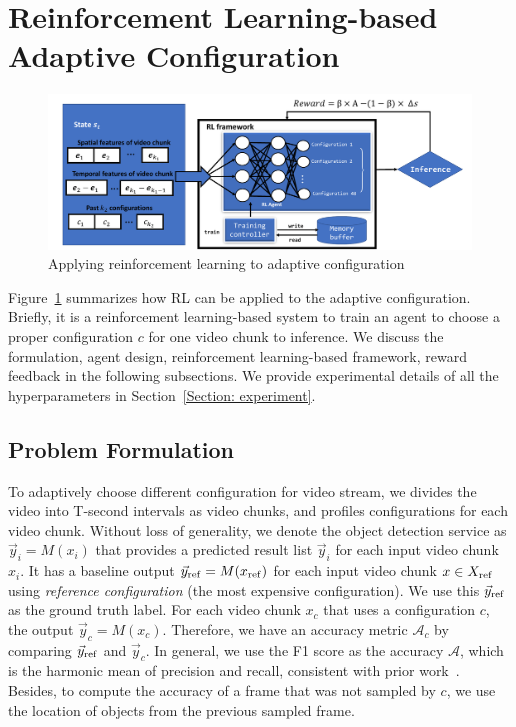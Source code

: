 \section{Reinforcement Learning-based Adaptive Configuration}
\label{Section: design}

\begin{figure}[!t]
	\centerline{\includegraphics[width=0.9\linewidth]{figures/framework2.pdf}}
	\caption{Applying reinforcement learning to adaptive configuration}
	\label{fig: DQN}
\end{figure}

Figure~\ref{fig: DQN} summarizes how RL can be applied to the adaptive configuration. Briefly, it is a reinforcement learning-based system to train an agent to choose a proper configuration $ c $ for one video chunk to inference. We discuss the formulation, agent design, reinforcement learning-based framework, reward feedback in the following subsections. We provide experimental details of all the hyperparameters in Section~\ref{Section: experiment}. %

\subsection{Problem Formulation}
\label{subsec: formulation}

To adaptively choose different configuration for video stream, we divides the video into T-second intervals as video chunks, and profiles configurations for each video chunk. Without loss of generality, we denote the object detection service as $ \vec{y}_i = M(x_i) $ that provides a predicted result list $ \vec{y}_i $ for each input video chunk $ x_i $. It has a baseline output $ \vec{y}_{\rm ref} = M(x_{\rm ref}) $ for each input video chunk $ x \in X_{\rm ref} $ using \emph{reference configuration} (the most expensive configuration). We use this $ \vec{y}_{\rm ref} $ as the ground truth label. For each video chunk $ x_c $ that uses a configuration $ c $, the output $ \vec{y}_c = M(x_c) $. Therefore, we have an accuracy metric $ \mathcal{A}_c $ by comparing $ \vec{y}_{\rm ref} $ and $ \vec{y}_c $. In general, we use the F1 score as the accuracy $ \mathcal{A} $, which is the harmonic mean of precision and recall, consistent with prior work~\cite{jiang2018chameleon,kang2017f1_noscope,zhang2017f1_live}. Besides, to compute the accuracy of a frame that was not sampled by $ c $, we use the location of objects from the previous sampled frame. 

